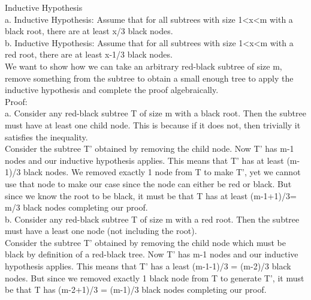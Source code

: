 \documentclass[10pt,letterpaper]{article}
\begin{document}
\begin{itemize}
Inductive Hypothesis\\
a. Inductive Hypothesis: Assume that for all subtrees with size 1<x<m with a black root, there are at least x/3 black nodes.\\
b. Inductive Hypothesis: Assume that for all subtrees with size 1<x<m with a red
root, there are at least x-1/3 black nodes.\\
We want to show how we can take an arbitrary red-black subtree of size m, remove something from the subtree to obtain a small enough tree to apply the inductive hypothesis and complete the proof algebraically.\\

Proof:\\
a. Consider any red-black subtree T of size m with a black root. Then the subtree must have at least one child node. This is because if it does not, then trivially it satisfies the inequality.\\
Consider the subtree T’ obtained by removing the child node. Now T’ has m-1 nodes and our inductive hypothesis applies. This means that T’ has at least (m-1)/3 black nodes. We removed exactly 1 node from T to make T’, yet we cannot use that node to make our case since the node can either be red or black. But since we know the root to be black, it must be that T has at least (m-1+1)/3= m/3 black nodes completing our proof.\\
b. Consider any red-black subtree T of size m with a red root. Then the subtree must have a least one node (not including the root).\\
Consider the subtree T’ obtained by removing the child node which must be
black by definition of a red-black tree. Now T’ has m-1 nodes and our inductive hypothesis applies. This means that T’ has a least (m-1-1)/3 = (m-2)/3 black nodes. But since we removed exactly 1 black node from T to generate T’, it must be that T has (m-2+1)/3 = (m-1)/3 black nodes completing our proof.\\



\end{itemize}
\end{document}
